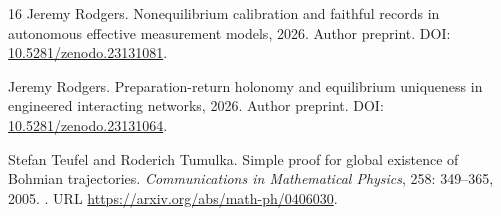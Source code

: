 \documentclass[11pt]{article}
\numberwithin{equation}{section}
\theoremstyle{definition}
\begin{document}
\begin{thebibliography}{16}
Jeremy Rodgers.
\newblock Nonequilibrium calibration and faithful records in autonomous
  effective measurement models, 2026{}.
\newblock Author preprint. DOI:
  \href{https://doi.org/10.5281/zenodo.23131081}{10.5281/zenodo.23131081}.

Jeremy Rodgers.
\newblock Preparation-return holonomy and equilibrium uniqueness in engineered
  interacting networks, 2026{}.
\newblock Author preprint. DOI:
  \href{https://doi.org/10.5281/zenodo.23131064}{10.5281/zenodo.23131064}.

Stefan Teufel and Roderich Tumulka.
\newblock Simple proof for global existence of {Bohmian} trajectories.
\newblock \emph{Communications in Mathematical Physics}, 258:
  349--365, 2005.
\newblock {}.
\newblock URL \url{https://arxiv.org/abs/math-ph/0406030}.

\end{thebibliography}
\end{document}
